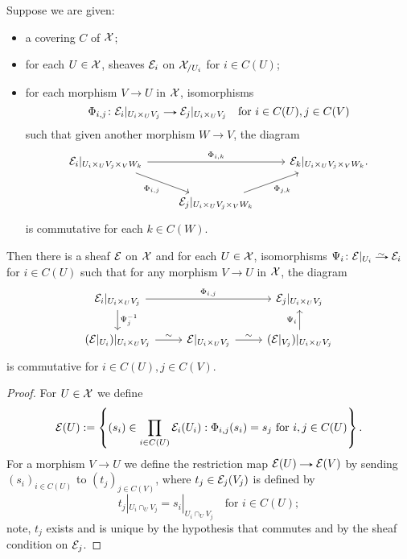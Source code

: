 \begin{appendices}
  \begin{lemma}
    \label{glueing}
    Suppose we are given:
    \begin{itemize}
    \item a covering $C$ of $\mathcal{X}$;
    \item for each $U \in \mathcal{X}$, sheaves $\mathcal{E}_i$ on $\mathcal{X}_{/U_i}$ for $i
      \in C(U)$;
    \item for each morphism $V \to U$ in $\mathcal{X}$, isomorphisms
      \[
      \Phi_{i,j} \c \E_i|_{U_i \times_U V_j} \to \E_j|_{U_i \times_U
        V_j} \quad \text{for } i \in C(U), j \in C(V)
      \]
      such that given another morphism $W \to V$, the diagram
      \begin{equation}
        \label{glue-cocycle}
        \begin{tikzcd}
          \E_i|_{U_i \times_U V_j \times_V W_k}
          \ar[rr, "\Phi_{i,k}"] \ar[dr, "\Phi_{i,j}"'] & &
          \E_k|_{U_i \times_U V_j \times_V W_k}. \\
          & \E_j|_{U_i \times_U V_j \times_V W_k}
          \ar[ur, "\Phi_{j,k}"'] &
        \end{tikzcd}
      \end{equation}
      is commutative for each $k \in C(W)$.
    \end{itemize}
    Then there is a sheaf $\mathcal{E}$ on $\mathcal{X}$ and for each $U \in \mathcal{X}$,
    isomorphisms $\Psi_i \c \E|_{U_i} \isoto \E_i$ for $i \in
    C(U)$ such that for any morphism $V \to U$ in $\mathcal{X}$, the diagram
    \[
    \begin{tikzcd}
      \E_i|_{U_i \times_U V_j}
      \ar[d, "\Psi_j^{-1}"] \ar[rr, "\Phi_{i,j}"] & &
      \E_j|_{U_i \times_U V_j} \\
      (\E|_{U_i})|_{U_i \times_U V_j} \ar[r, "\sim"] &
      \E|_{U_i \times_U V_j} \ar[r, "\sim"] &
      (\E|_{V_j})|_{U_i \times_U V_j} \ar[u, "\Psi_i"]
    \end{tikzcd}
    \]
    is commutative for $i \in C(U), j \in C(V)$.
  \end{lemma}

  \begin{proof}
    For $U \in \mathcal{X}$ we define
    \[
    \mathcal{E}(U) \mathrel{:=} \left\{ (s_i) \in \prod_{i \in C(U)} \mathcal{E}_i(U_i) :
    \Phi_{i,j}(s_i) = s_j \text{ for } i,j \in C(U) \right\}.
    \]
    For a morphism $V \to U$ we define the restriction map $\E(U) \to
    \E(V)$ by sending $(s_i)_{i \in C(U)}$ to $(t_j)_{j \in C(V)}$,
    where $t_j \in \mathcal{E}_j(V_j)$ is defined by
    \[
    t_j|_{U_i \cap_U V_j} = s_i|_{U_i \cap_U V_j} \quad\text{for } i
    \in C(U);
    \]
    note, $t_j$ exists and is unique by the hypothesis that
     commutes and by the sheaf condition on $\mathcal{E}_j$.
  \end{proof}
\end{appendices}


\nocite{stacks}





